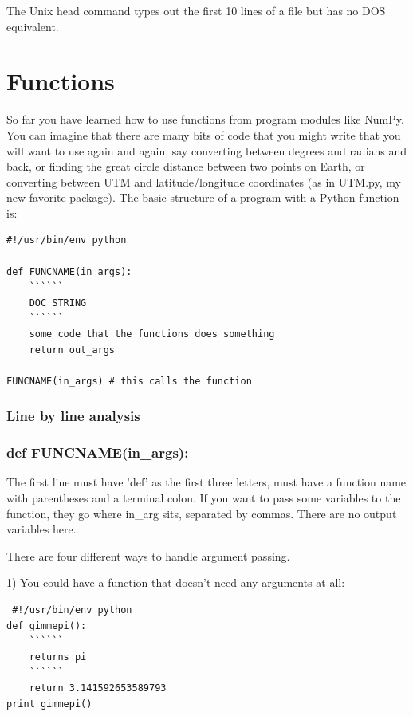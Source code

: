 \documentclass[11pt]{book}
\begin{document}
{{\noindent The Unix {\color{blue}head} command types out the first 10 lines of a file but has no DOS equivalent.


\section{Functions}

So far you have learned how to use functions from program modules like {\color{blue}NumPy}.  You can imagine that there are many bits of code that you might write that you will want to use again and again, say converting between degrees and radians and back, or finding the great circle distance between two points on Earth, or converting between UTM and latitude/longitude coordinates (as in {\color{blue}UTM.py}, my new favorite package).      The basic structure of a program with a  Python function is:


{ \color{blue} \begin{verbatim}
#!/usr/bin/env python

def FUNCNAME(in_args):
    ``````
    DOC STRING
    ``````
    some code that the functions does something
    return out_args

FUNCNAME(in_args) # this calls the function
\end{verbatim}}



\subsubsection{Line by line analysis}
\subsubsection{def FUNCNAME(in\_args):}

\noindent The first line must have 'def' as the first three letters, must have a function name with parentheses and a terminal colon.  If you want to pass some variables to the function, they go where  in\_arg sits, separated by commas.  There are no output variables here.

 There are four different ways to handle argument passing.

 1) You could have a function that doesn't  need any arguments at all:

 { \color{blue} \begin{verbatim}
 #!/usr/bin/env python
def gimmepi():
    ``````
    returns pi
    ``````
    return 3.141592653589793
print gimmepi()
\end{verbatim}}

}}
\end{document}
